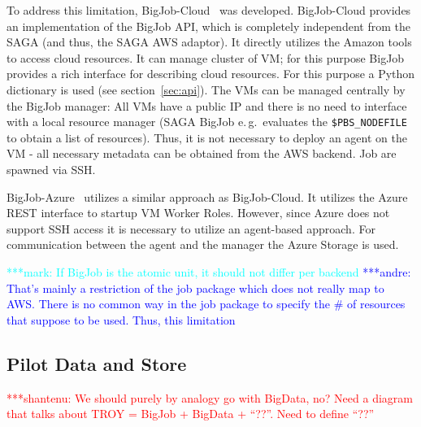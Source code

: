 \documentclass[conference,final]{IEEEtran}
\newcommand{\jhanote}[1]{ {\textcolor{red} { ***shantenu: #1 }}}
\newcommand{\alnote}[1]{ {\textcolor{blue} { ***andre: #1 }}}
\newcommand{\msnote}[1]{ {\textcolor{cyan} { ***mark: #1 }}}
\newcommand{\alnote}[1]{}
\newcommand{\jhanote}[1]{}
\begin{document}
To address this limitation, BigJob-Cloud~\cite{saga_bigjob_condor_cloud} was
developed. BigJob-Cloud provides an implementation of the BigJob API, which is
completely independent from the SAGA (and thus, the SAGA AWS adaptor). It
directly utilizes the Amazon tools to access cloud resources. It can manage
cluster of VM; for this purpose BigJob provides a rich interface for describing
cloud resources. For this purpose a Python dictionary is used (see
section~\ref{sec:api}). The VMs can be managed centrally by the BigJob manager:
All VMs have a public IP and there is no need to interface with a local resource
manager (SAGA BigJob e.\,g.\ evaluates the \texttt{\$PBS\_NODEFILE} to obtain a
list of resources). Thus, it is not necessary to deploy an agent on the VM - all
necessary metadata can be obtained from the AWS backend. Job are spawned via
SSH.



BigJob-Azure~\cite{10.1109/CloudCom.2010.85} utilizes a similar approach as
BigJob-Cloud. It utilizes the Azure REST interface to startup VM Worker Roles.
However, since Azure does not support SSH access it is necessary to utilize an
agent-based approach. For communication between the agent and the manager the
Azure Storage is used.

\msnote{If BigJob is the atomic unit, it should not differ per
  backend}\alnote{That's mainly a restriction of the job package which
  does not really map to AWS. There is no common way in the job
  package to specify the \# of resources that suppose to be
  used. Thus, this limitation}


\subsection{Pilot Data and Store}

\jhanote{We should purely by analogy go with BigData, no? Need a
  diagram that talks about TROY = BigJob + BigData + ``??''. Need to
  define ``??''}
\end{document}
